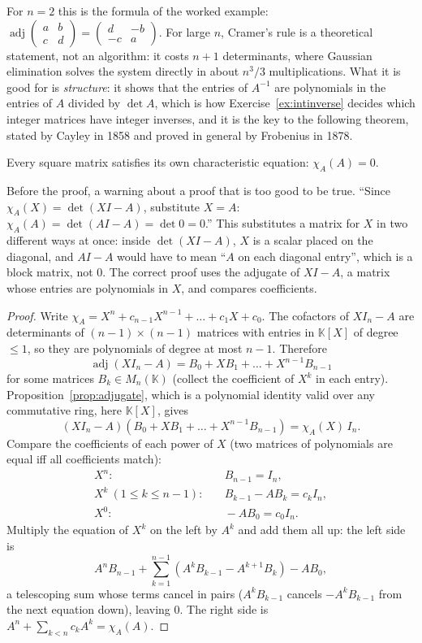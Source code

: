 For $n=2$ this is the formula of the worked example: $\operatorname{adj}\begin{pmatrix}a&b\\c&d\end{pmatrix}=\begin{pmatrix}d&-b\\-c&a\end{pmatrix}$. For large $n$, Cramer's rule is a theoretical statement, not an algorithm: it costs $n+1$ determinants, where Gaussian elimination solves the system directly in about $n^3/3$ multiplications. What it is good for is \emph{structure}: it shows that the entries of $A^{-1}$ are polynomials in the entries of $A$ divided by $\det A$, which is how Exercise~\ref{ex:intinverse} decides which integer matrices have integer inverses, and it is the key to the following theorem, stated by Cayley in 1858 and proved in general by Frobenius in 1878.

\begin{theorem}\label{thm:cayleyhamilton}
Every square matrix satisfies its own characteristic equation: $\chi_A(A)=0$.
\end{theorem}

Before the proof, a warning about a proof that is too good to be true. ``Since $\chi_A(X)=\det(XI-A)$, substitute $X=A$: $\chi_A(A)=\det(AI-A)=\det0=0$.'' This substitutes a matrix for $X$ in two different ways at once: inside $\det(XI-A)$, $X$ is a scalar placed on the diagonal, and $AI-A$ would have to mean ``$A$ on each diagonal entry'', which is a block matrix, not $0$. The correct proof uses the adjugate of $XI-A$, a matrix whose entries are polynomials in $X$, and compares coefficients.

\begin{proof}
Write $\chi_A=X^n+c_{n-1}X^{n-1}+\dots+c_1X+c_0$. The cofactors of $XI_n-A$ are determinants of $(n-1)\times(n-1)$ matrices with entries in $\mathbb K[X]$ of degree $\le1$, so they are polynomials of degree at most $n-1$. Therefore
\[
\operatorname{adj}(XI_n-A)=B_0+XB_1+\dots+X^{n-1}B_{n-1}
\]
for some matrices $B_k\in M_n(\mathbb K)$ (collect the coefficient of $X^k$ in each entry). Proposition~\ref{prop:adjugate}, which is a polynomial identity valid over any commutative ring, here $\mathbb K[X]$, gives
\[
(XI_n-A)\left(B_0+XB_1+\dots+X^{n-1}B_{n-1}\right)=\chi_A(X)\,I_n .
\]
Compare the coefficients of each power of $X$ (two matrices of polynomials are equal iff all coefficients match):
\[
\begin{aligned}
X^n:&\quad B_{n-1}=I_n,\\
X^k\ (1\le k\le n-1):&\quad B_{k-1}-AB_k=c_kI_n,\\
X^0:&\quad -AB_0=c_0I_n.
\end{aligned}
\]
Multiply the equation of $X^k$ on the left by $A^k$ and add them all up: the left side is
\[
A^nB_{n-1}+\sum_{k=1}^{n-1}\left(A^kB_{k-1}-A^{k+1}B_k\right)-AB_0 ,
\]
a telescoping sum whose terms cancel in pairs ($A^kB_{k-1}$ cancels $-A^{k}B_{k-1}$ from the next equation down), leaving $0$. The right side is $A^n+\sum_{k<n}c_kA^k=\chi_A(A)$.
\end{proof}

